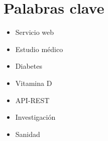 \chapter*{Palabras clave}

\begin{itemize}
    \item Servicio web
    \item Estudio médico
    \item Diabetes
    \item Vitamina D
    \item API-REST
    \item Investigación
    \item Sanidad
\end{itemize}
